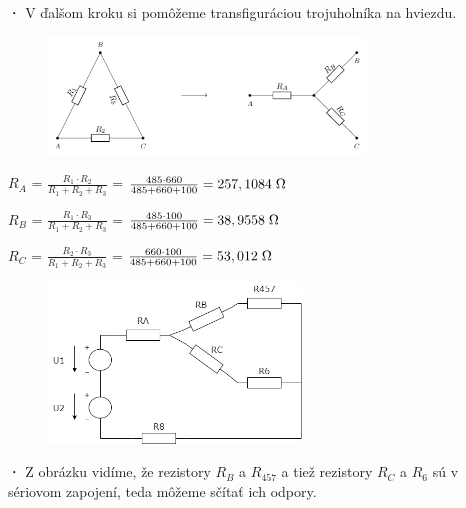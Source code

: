 \newpage

\textbf{·}
V ďalšom kroku si pomôžeme transfiguráciou trojuholníka na hviezdu.\\

\begin{figure}[h!]
    \centering
    \includegraphics[width=0.75\textwidth]{IEL-Project/pictures/Pr1_3.png}
\end{figure}

\begin{center}
$R_{A}$ = $\frac{R_1 \cdot R_{2}}{R_1 + R_2 + R_3}$ = $\frac{485\cdot660}{485 + 660 + 100} = 257,1084 \hspace{0,1cm} \SI{}{\ohm} $
\end{center}

\begin{center}
$R_{B}$ = $\frac{R_1 \cdot R_{3}}{R_1 + R_2 + R_3}$ = $\frac{485\cdot100}{485 + 660 + 100} = 38,9558 \hspace{0,1cm} \SI{}{\ohm} $
\end{center}

\begin{center}
$R_{C}$ = $\frac{R_2 \cdot R_3}{R_1 + R_2 + R_3}$ = $\frac{660 \cdot 100}{485 + 660 + 100} = 53,012 \hspace{0,1cm} \SI{}{\ohm}$
\end{center}

\begin{figure}[h!]
    \centering
    \includegraphics[width=0.6\textwidth]{IEL-Project/pictures/Pr1_4.png}
\end{figure}

\textbf{·}
Z obrázku vidíme, že rezistory $R_B$ a $R_457$ a tiež rezistory $R_C$ a $R_6$ sú v sériovom zapojení, teda môžeme sčítať ich odpory.\\

